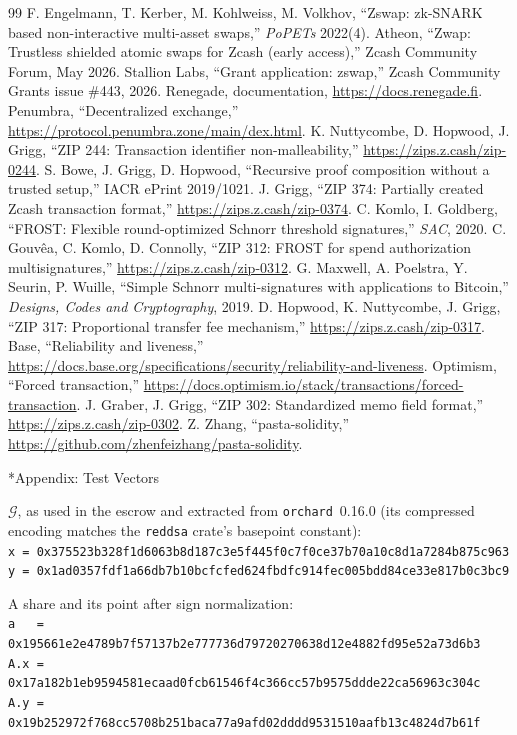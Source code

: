 \documentclass[10pt,letterpaper]{article}
\makeatletter
\renewcommand\section{\@startsection{section}{1}{\z@}{-1.3em}{0.45em}{\normalfont\large\bfseries}}
\newcommand{\Gor}{\mathcal{G}}
\newcommand{\fn}[1]{\texttt{#1}}
\makeatother
\begin{document}
\begin{thebibliography}{99}
 F. Engelmann, T. Kerber, M. Kohlweiss, M. Volkhov, ``Zswap: zk-SNARK based non-interactive multi-asset swaps,'' \emph{PoPETs} 2022(4).
 Atheon, ``Zwap: Trustless shielded atomic swaps for Zcash (early access),'' Zcash Community Forum, May 2026.
 Stallion Labs, ``Grant application: zswap,'' Zcash Community Grants issue \#443, 2026.
 Renegade, documentation, \url{https://docs.renegade.fi}.
 Penumbra, ``Decentralized exchange,'' \url{https://protocol.penumbra.zone/main/dex.html}.
 K. Nuttycombe, D. Hopwood, J. Grigg, ``ZIP 244: Transaction identifier non-malleability,'' \url{https://zips.z.cash/zip-0244}.
 S. Bowe, J. Grigg, D. Hopwood, ``Recursive proof composition without a trusted setup,'' IACR ePrint 2019/1021.
 J. Grigg, ``ZIP 374: Partially created Zcash transaction format,'' \url{https://zips.z.cash/zip-0374}.
 C. Komlo, I. Goldberg, ``FROST: Flexible round-optimized Schnorr threshold signatures,'' \emph{SAC}, 2020.
 C. Gouv\^{e}a, C. Komlo, D. Connolly, ``ZIP 312: FROST for spend authorization multisignatures,'' \url{https://zips.z.cash/zip-0312}.
 G. Maxwell, A. Poelstra, Y. Seurin, P. Wuille, ``Simple Schnorr multi-signatures with applications to Bitcoin,'' \emph{Designs, Codes and Cryptography}, 2019.
 D. Hopwood, K. Nuttycombe, J. Grigg, ``ZIP 317: Proportional transfer fee mechanism,'' \url{https://zips.z.cash/zip-0317}.
 Base, ``Reliability and liveness,'' \url{https://docs.base.org/specifications/security/reliability-and-liveness}.
 Optimism, ``Forced transaction,'' \url{https://docs.optimism.io/stack/transactions/forced-transaction}.
 J. Graber, J. Grigg, ``ZIP 302: Standardized memo field format,'' \url{https://zips.z.cash/zip-0302}.
 Z. Zhang, ``pasta-solidity,'' \url{https://github.com/zhenfeizhang/pasta-solidity}.
\end{thebibliography}

\appendix
\section*{Appendix: Test Vectors}
{\small
$\Gor$, as used in the escrow and extracted from \fn{orchard}~0.16.0 (its compressed encoding matches the \fn{reddsa} crate's basepoint constant):\\
\texttt{x = 0x375523b328f1d6063b8d187c3e5f445f0c7f0ce37b70a10c8d1a7284b875c963}\\
\texttt{y = 0x1ad0357fdf1a66db7b10bcfcfed624fbdfc914fec005bdd84ce33e817b0c3bc9}

A share and its point after sign normalization:\\
\texttt{a\ \ \ = 0x195661e2e4789b7f57137b2e777736d79720270638d12e4882fd95e52a73d6b3}\\
\texttt{A.x = 0x17a182b1eb9594581ecaad0fcb61546f4c366cc57b9575ddde22ca56963c304c}\\
\texttt{A.y = 0x19b252972f768cc5708b251baca77a9afd02dddd9531510aafb13c4824d7b61f}
}
\end{document}
